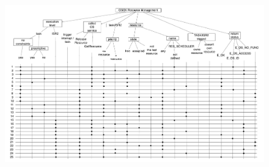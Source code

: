 \documentclass[10pt]{article}
\begin{document}
	\begin{figure}[htbp] %
   		\centering
		\includegraphics[width=1\textwidth]{graphics/OSEK_Resource_Management.pdf}
	\end{figure}
		
\end{document}
